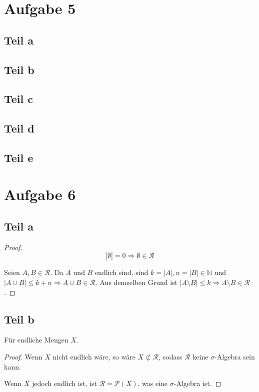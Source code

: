 \documentclass[10pt,a4paper]{article}
\begin{document}
\section{Aufgabe 5}

\subsection{Teil a}

\subsection{Teil b}

\subsection{Teil c}

\subsection{Teil d}

\subsection{Teil e}

\section{Aufgabe 6}

\subsection{Teil a}
\begin{proof}
  \begin{equation}
    |\emptyset| = 0 \Rightarrow \emptyset \in \mathscr{R}
  \end{equation}
  
  Seien $A, B \in \mathscr{R}$.
  Da $A$ und $B$ endlich sind, sind $k = |A|, n = |B| \in \mathbb{N}$ und $|A \cup B| \le k + n \Rightarrow A \cup B \in \mathscr{R}$.
  Aus demselben Grund ist $|A \setminus B| \le k \Rightarrow A \setminus B \in \mathscr{R}$.
\end{proof}

\subsection{Teil b}
Für endliche Mengen $X$.
\begin{proof}
  Wenn $X$ nicht endlich wäre, so wäre $X \not\subset \mathscr{R}$, sodass $\mathscr{R}$ keine $\sigma$-Algebra sein kann.
  
  Wenn $X$ jedoch endlich ist, ist $\mathscr{R} = \mathscr{P}(X)$, was eine $\sigma$-Algebra ist.
\end{proof}
\end{document}

